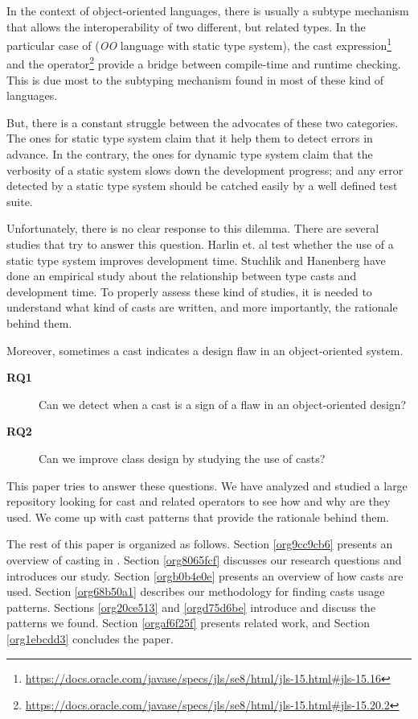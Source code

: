 In the context of object-oriented languages, there is usually a subtype mechanism that allows the interoperability of two different, but related types. 
In the particular case of \java{} (\emph{OO} language with static type system), the cast expression\footnote{\url{https://docs.oracle.com/javase/specs/jls/se8/html/jls-15.html\#jls-15.16}} and the \instanceof{} operator\footnote{\url{https://docs.oracle.com/javase/specs/jls/se8/html/jls-15.html\#jls-15.20.2}} provide a bridge between compile-time and runtime checking. 
This is due most to the subtyping mechanism found in most of these kind of languages. 

But, there is a constant struggle between the advocates of these two categories. 
The ones for static type system claim that it help them to detect errors in advance. 
In the contrary, the ones for dynamic type system claim that the verbosity of a static system slows down the development progress; and any error detected by a static type system should be catched easily by a well defined test suite. 

Unfortunately, there is no clear response to this dilemma. 
There are several studies that try to answer this question. 
Harlin et. al \cite{harlin_impact_2017} test whether the use of a static type system improves development time. 
Stuchlik and Hanenberg \cite{stuchlik_static_2011} have done an empirical study about the relationship between type casts and development time. 
To properly assess these kind of studies, it is needed to understand what kind of casts are written, and more importantly, the rationale behind them. 

Moreover, sometimes a cast indicates a design flaw in an object-oriented system. 
\begin{description}
\item[{\textbf{RQ1}}] Can we detect when a cast is a sign of a flaw in an object-oriented design?
\item[{\textbf{RQ2}}] Can we improve class design by studying the use of casts?
\end{description}

This paper tries to answer these questions. 
We have analyzed and studied a large \java{} repository looking for cast and related operators to see how and why are they used. 
We come up with cast patterns that provide the rationale behind them. 

The rest of this paper is organized as follows. 
Section \ref{org9cc9cb6} presents an overview of casting in \java{}. 
Section \ref{org8065fcf} discusses our research questions and introduces our study. 
Section \ref{orgb0b4e0e} presents an overview of how casts are used. 
Section \ref{org68b50a1} describes our methodology for finding casts usage patterns. 
Sections \ref{org20ce513} and \ref{orgd75d6be} introduce and discuss the patterns we found. 
Section \ref{orgaf6f25f} presents related work, and Section \ref{org1ebcdd3} concludes the paper. 

